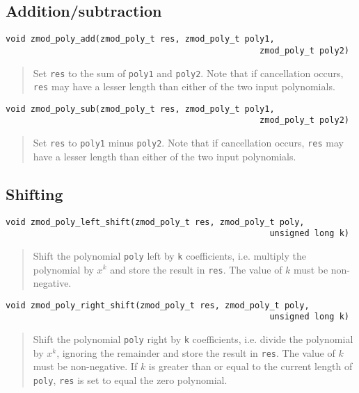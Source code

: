 \documentclass[a4paper,10pt]{article}
\newcommand{\code}{\lstinline}
\begin{document}
\subsection{Addition/subtraction}
\begin{lstlisting}
void zmod_poly_add(zmod_poly_t res, zmod_poly_t poly1, 
                                                   zmod_poly_t poly2)
\end{lstlisting}
\begin{quote}
Set \code{res} to the sum of \code{poly1} and \code{poly2}. Note that if cancellation occurs, \code{res} may have a lesser length than either of the two input polynomials.
\end{quote}

\begin{lstlisting}
void zmod_poly_sub(zmod_poly_t res, zmod_poly_t poly1, 
                                                   zmod_poly_t poly2)
\end{lstlisting}
\begin{quote}
Set \code{res} to \code{poly1} minus \code{poly2}. Note that if cancellation occurs, \code{res} may have a lesser length than either of the two input polynomials.
\end{quote}

\subsection{Shifting}
\begin{lstlisting}
void zmod_poly_left_shift(zmod_poly_t res, zmod_poly_t poly, 
                                                     unsigned long k)
\end{lstlisting}
\begin{quote}
Shift the polynomial \code{poly} left by \code{k} coefficients, i.e. multiply the polynomial by $x^k$ and store the result in \code{res}. The value of $k$ must be non-negative.
\end{quote}

\begin{lstlisting}
void zmod_poly_right_shift(zmod_poly_t res, zmod_poly_t poly, 
                                                     unsigned long k)
\end{lstlisting}
\begin{quote}
Shift the polynomial \code{poly} right by \code{k} coefficients, i.e. divide the polynomial by $x^k$, ignoring the remainder and store the result in \code{res}. The value of $k$ must be non-negative. If $k$ is greater than or equal to the current length of \code{poly}, \code{res} is set to equal the zero polynomial.
\end{quote}
\end{document}
